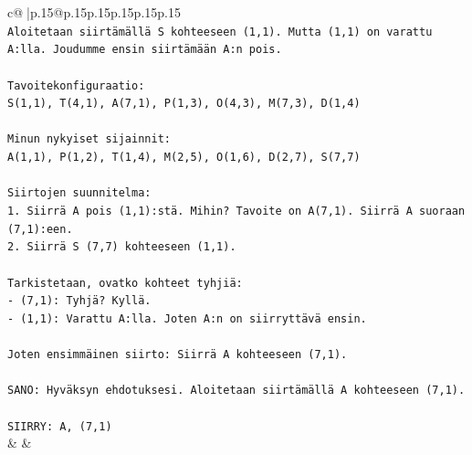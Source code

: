 \documentclass{article}
\begin{document}
{\begin{supertabular}{c@{$\;$}|p{.15\linewidth}@{}p{.15\linewidth}p{.15\linewidth}p{.15\linewidth}p{.15\linewidth}p{.15\linewidth}}
{{{\\ 
\texttt{Aloitetaan siirtämällä S kohteeseen (1,1). Mutta (1,1) on varattu A:lla. Joudumme ensin siirtämään A:n pois.} \\
\\ 
\texttt{Tavoitekonfiguraatio:} \\
\texttt{S(1,1), T(4,1), A(7,1), P(1,3), O(4,3), M(7,3), D(1,4)} \\
\\ 
\texttt{Minun nykyiset sijainnit:} \\
\texttt{A(1,1), P(1,2), T(1,4), M(2,5), O(1,6), D(2,7), S(7,7)} \\
\\ 
\texttt{Siirtojen suunnitelma:} \\
\texttt{1. Siirrä A pois (1,1):stä. Mihin? Tavoite on A(7,1). Siirrä A suoraan (7,1):een.} \\
\texttt{2. Siirrä S (7,7) kohteeseen (1,1).} \\
\\ 
\texttt{Tarkistetaan, ovatko kohteet tyhjiä:} \\
\texttt{{-} (7,1): Tyhjä? Kyllä.} \\
\texttt{{-} (1,1): Varattu A:lla. Joten A:n on siirryttävä ensin.} \\
\\ 
\texttt{Joten ensimmäinen siirto: Siirrä A kohteeseen (7,1).} \\
\\ 
\texttt{SANO: Hyväksyn ehdotuksesi. Aloitetaan siirtämällä A kohteeseen (7,1).} \\
\\ 
\texttt{SIIRRY: A, (7,1)} \\
            }
        }
    }
    & & \\ \\


\end{supertabular}}
\end{document}
